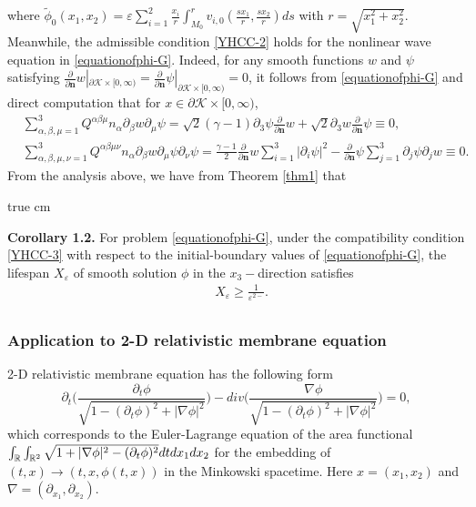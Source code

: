 \documentclass[11pt,twoside]{article}
\def\cK{\mathcal K}
\def\ds{\displaystyle}
\def\f{\frac}
\def\p{\partial}
\def\ve{\varepsilon}
\def\bn{\mathbf{n}}
\theoremstyle{plain}
\theoremstyle{definition}
\numberwithin{equation}{section}
\begin{document}
where $\tilde{\phi}_0(x_1,x_2)=\ve\ds\sum_{i=1}^2\f{x_i}{r}\int_{M_0}^{r}v_{i,0}(\f{sx_1}{r}, \f{sx_2}{r})ds$ with $r=\sqrt{x_1^2+x_2^2}$.
Meanwhile, the admissible condition \eqref{YHCC-2} holds for the nonlinear wave equation in \eqref{equationofphi-G}.
Indeed, for any smooth functions
$w$ and $\psi$ satisfying $\f{\p}{\p\bn}w|_{\p\cK\times[0,\infty)}=\f{\p}{\p\bn}\psi|_{\p\cK\times[0,\infty)}=0$,
it follows from \eqref{equationofphi-G} and direct computation that for $x\in\p\cK\times[0,\infty)$,
\begin{equation}\label{YHHC-111-G}
\begin{split}
&\sum_{\alpha,\beta,\mu=1}^3Q^{\alpha\beta\mu}n_{\alpha}\p_{\beta}w\p_{\mu}\psi=\sqrt{2}(\gamma-1)\p_3\psi\f{\p}{\p\bn}w
+\sqrt{2}\p_3w\f{\p}{\p\bn}\psi\equiv0,\\
&\sum_{\alpha,\beta,\mu,\nu=1}^3Q^{\alpha\beta\mu\nu}n_{\alpha}\p_{\beta}w\p_{\mu}\psi\p_{\nu}\psi=\f{\gamma-1}{2}
\f{\p}{\p\bn}w\sum_{i=1}^3|\p_i\psi|^2-\f{\p}{\p\bn}\psi\sum_{j=1}^3\p_j\psi\p_jw
\equiv0.
\end{split}
\end{equation}
From the analysis above, we have from Theorem \ref{thm1} that

 true cm

{\bf Corollary 1.2.} For problem \eqref{equationofphi-G},
under the compatibility condition \eqref{YHCC-3} with respect to the initial-boundary values of \eqref{equationofphi-G},
the lifespan $X_{\ve}$ of smooth solution $\phi$ in the $x_3-$direction satisfies
\begin{equation}\label{YHCC0-2-G}
\begin{split}
&X_\ve\ge\frac{1}{\ve^{2-}}.\\
\end{split}
\end{equation}




\subsubsection{Application to 2-D relativistic membrane equation}

2-D relativistic membrane equation has the following form
\begin{equation}\label{HCC-X}
\p_t\bigg(\ds\f{\p_t\phi}{\sqrt{1-(\p_t\phi)^2+|\nabla\phi|^2}}\bigg)
-div\bigg(\ds\f{\nabla\phi}{\sqrt{1-(\p_t\phi)^2+|\nabla\phi|^2}}\bigg)=0,
\end{equation}
which corresponds to the Euler-Lagrange equation of the area functional
$\int_{\Bbb R}\int_{\Bbb R^2}\sqrt{1+|\nabla \phi|^2-(\p_t\phi)^2}\\dtdx_1dx_2$
for the embedding of $(t,x)\to (t,x,\phi(t,x))$ in the Minkowski spacetime.
Here $x=(x_1,x_2)$ and $\nabla=(\p_{x_1}, \p_{x_2})$.
\end{document}
